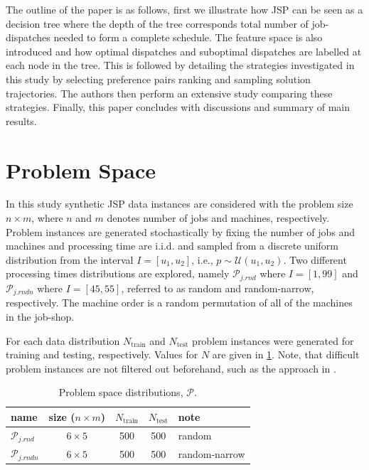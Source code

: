 \documentclass[smallextended]{llncs}
\begin{document}
The outline of the paper is as follows, first we illustrate how JSP can be seen as a decision tree where the depth of the tree corresponds 
total number of job-dispatches needed to form a complete schedule. The feature space is also introduced and how  optimal dispatches and suboptimal dispatches are labelled at each node in the tree. This is followed by detailing the strategies investigated in this study by selecting preference pairs ranking and sampling solution trajectories. The authors then perform an extensive study comparing these strategies. Finally, this paper concludes with discussions and summary of main results.

\section{Problem Space}
In this study synthetic JSP  data instances are considered with the problem size $n\times m$, where $n$ and $m$ denotes  number of jobs and machines, respectively. 
Problem instances are generated stochastically by fixing the number of jobs and machines and processing time are i.i.d. and sampled from a discrete uniform distribution from the interval $I=[u_1,u_2]$, i.e., $p\sim \mathcal{U}(u_1,u_2)$.
Two different processing times distributions are explored, namely 
$\mathcal{P}_{j.rnd}$ where $I=[1,99]$ and $\mathcal{P}_{j.rndn}$ where $I=[45,55]$, referred to as random and random-narrow, respectively.
The machine order is a random permutation of all of the machines in the job-shop. 

For each data distribution $N_{\text{train}}$  and $N_{\text{test}}$ problem instances were generated for training and testing, respectively. Values for $N$ are given in \cref{tbl:data:sim}. Note, that difficult problem instances are not filtered out beforehand, such as the approach in \cite{Whitley}. 

\begin{table}[t]\centering
\caption{Problem space distributions, $\mathcal{P}$. }\label{tbl:data:sim}
{\renewcommand{\arraystretch}{1.2}\footnotesize
\begin{tabular}{lcccl}\toprule
name&size ($n\times m$)& $N_{\text{train}}$&$N_{\text{test}}$  & note 
\\ \midrule
$\mathcal{P}_{j.rnd}$ & $6\times5$ & 500 & 500 & random \\
$\mathcal{P}_{j.rndn}$ & $6\times5$ & 500 & 500 & random-narrow \\
\bottomrule
\end{tabular}
}
\end{table}
\end{document}
